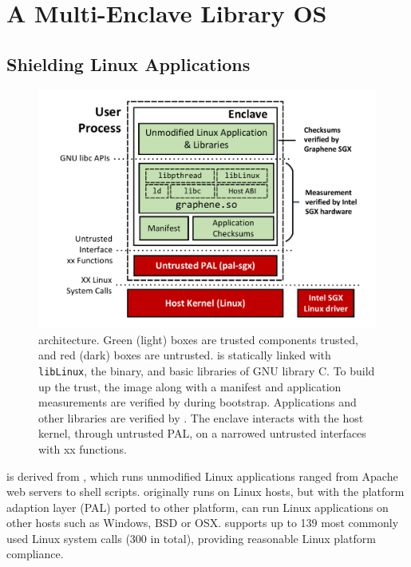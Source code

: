 \section{A Multi-Enclave Library OS}

\subsection{Shielding Linux Applications}
\label{sec:background:graphene}

\begin{figure}[t!]
\centering
\includegraphics[width=0.9\linewidth]{graphene-sgx/figures/architecture.pdf}
\vspace{-0.1in}
\footnotesize
\caption{
\sysname{} architecture.
Green (light) boxes are trusted components trusted,
and red (dark) boxes are untrusted.
\sysname{} is statically linked with {\tt libLinux},
the \libos{} binary, and basic libraries of GNU library C.
To build up the trust, the \sysname{} image along with
a manifest and application measurements
are verified by \sgx{} during bootstrap. Applications and other libraries
are verified by \sysname{}. The enclave interacts with the host kernel,
through untrusted PAL, on a narrowed untrusted interfaces with xx functions.
}
\label{fig:arch}
\end{figure}

\sysname{} is derived from \graphene{} \libos{}, which runs unmodified
Linux applications ranged from Apache web servers to shell scripts.
\graphene{} \libos{} originally runs on Linux hosts, but with the platform
adaption layer (PAL) ported to other platform,
\graphene{} can run Linux applications on other hosts such as
Windows, BSD or OSX.
\graphene{} supports up to 139 most commonly used Linux system calls
(300 in total),
providing reasonable Linux platform compliance.

